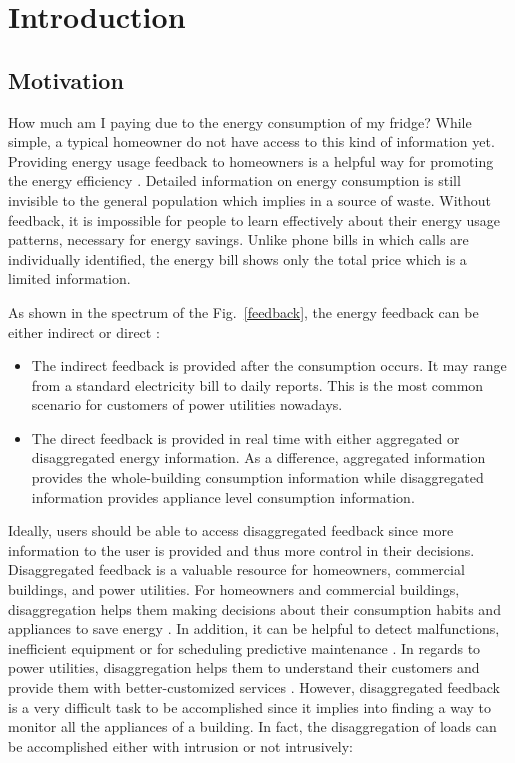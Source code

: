 \pagestyle{headings}

\chapter{Introduction}

\setcounter{page}{8}

\section{Motivation}

How much am I paying due to the energy consumption of my fridge? While simple, a typical homeowner do not have access to this kind of information yet. Providing energy usage feedback to homeowners is a helpful way for promoting the energy efficiency \cite{eci}. Detailed information on energy consumption is still invisible to the general population which implies in a source of waste. Without feedback, it is impossible for people to learn effectively about their energy usage patterns, necessary for energy savings. Unlike phone bills in which calls are individually identified, the energy bill shows only the total price which is a limited information. 

As shown in the spectrum of the Fig.~\ref{feedback}, the energy feedback can be either indirect or direct \cite{epri}: 

\begin{itemize}
\item The indirect feedback is provided after the consumption occurs. It may range from a standard electricity bill to daily reports. This is the most common scenario for customers of power utilities nowadays. 
\item The direct feedback is provided in real time with either aggregated or disaggregated energy information. As a difference, aggregated information provides the whole-building consumption information while disaggregated information provides appliance level consumption information.
\end{itemize}


Ideally, users should be able to access disaggregated feedback since more information to the user is provided and thus more control in their decisions. Disaggregated feedback is a valuable resource for homeowners, commercial buildings, and power utilities. For homeowners and commercial buildings, disaggregation helps them making decisions about their consumption habits and appliances to save energy \cite{CarrieArmel2013213}. In addition, it can be helpful to detect malfunctions, inefficient equipment or for scheduling predictive maintenance \cite{eunilm2016}. In regards to power utilities, disaggregation helps them to understand their customers and provide them with better-customized services \cite{eunilm2016-2}. However, disaggregated feedback is a very difficult task to be accomplished since it implies into finding a way to monitor all the appliances of a building. In fact, the disaggregation of loads can be accomplished either with intrusion or not intrusively:

